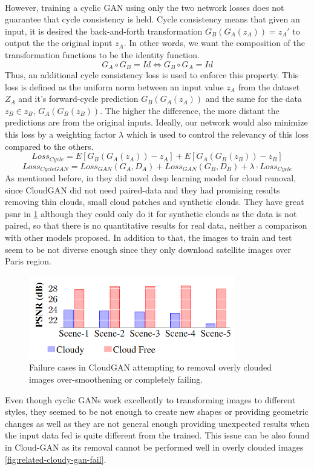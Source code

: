 \documentclass[../main.tex]{subfiles}
\begin{document}
\\
However, training a cyclic GAN using only the two network losses does not guarantee that cycle consistency is held. Cycle consistency means that given an input, it is desired the back-and-forth transformation $G_B(G_A(z_A)) = z_A'$ to output the the original input $z_A$.  In other words, we want the composition of the transformation functions to be the identity function.
\[G_A \circ G_B = Id \Longleftrightarrow G_B \circ G_A = Id\]
Thus, an additional cycle consistency loss is used to enforce this property. This loss is defined as the uniform norm between an input value $z_A$ from the dataset $Z_A$ and it's forward-cycle prediction $G_B(G_A(z_A))$ and the same for the data $z_B \in z_B$, $G_A(G_B(z_B))$. The higher the difference, the more distant the predictions are from the original inputs. Ideally, our network would also minimize this loss by a weighting factor $\lambda$ which is used to control the relevancy of this loss compared to the others.
\[Loss_{Cycle} = E[G_B(G_A(z_A)) - z_A] + E[G_A(G_B(z_B)) - z_B] \] %
\[Loss_{CycleGAN} = Loss_{GAN}(G_A, D_A) + Loss_{GAN}(G_B, D_B) + \lambda \cdot Loss_{Cycle}\]
As mentioned before, in \cite{cloud-gan} they did novel deep learning model for cloud removal, since CloudGAN did not need paired-data and they had promising results removing thin clouds, small cloud patches and synthetic clouds. They have great \gls{psnr} in \ref{fig:related-cycle-psnr} although they could only do it for synthetic clouds as the data is not paired, so that there is no quantitative results for real data, neither a comparison with other models proposed. In addition to that, the images to train and test seem to be not diverse enough since they only download satellite images over Paris region.
\begin{figure}[H]
	\centering
	\includegraphics[width=9cm]{imgs/relatedwork/cycle-gan-psnr.png}
	\caption{Failure cases in CloudGAN attempting to removal overly clouded images over-smoothening or completely failing.}
	\label{fig:related-cycle-psnr}
\end{figure}
Even though cyclic GANs work excellently to transforming images to different styles, they seemed to be not enough to create new shapes or providing geometric changes as well as they are not general enough providing unexpected results when the input data fed is quite different from the trained. This issue can be also found in Cloud-GAN as its removal cannot be performed well in overly clouded images \ref{fig:related-cloudy-gan-fail}.
\end{document}
